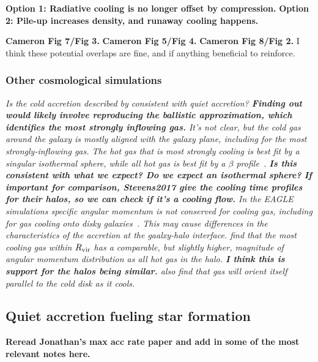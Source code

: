\documentclass[fleqn,usenatbib]{mnras}
\begin{document}
\textbf{Option 1: Radiative cooling is no longer offset by compression.}
\textbf{Option 2: Pile-up increases density, and runaway cooling happens.}

\textbf{Cameron Fig 7/Fig 3.}
\textbf{Cameron Fig 5/Fig 4.}
\textbf{Cameron Fig 8/Fig 2.}
I think these potential overlaps are fine, and if anything beneficial to reinforce.

\subsubsection{Other cosmological simulations}

\textit{
Is the cold accretion described by \cite{Ho2019} consistent with quiet accretion?
\textbf{Finding out would likely involve reproducing the ballistic approximation, which identifies the most strongly inflowing gas.}
It's not clear, but the cold gas around the galaxy is mostly aligned with the galaxy plane, including for the most strongly-inflowing gas.
The hot gas that is most strongly cooling is best fit by a singular isothermal sphere, while all hot gas is best fit by a $\beta$ profile~\citep{Stevens2017}.
\textbf{Is this consistent with what we expect? Do we expect an isothermal sphere?}
\textbf{If important for comparison, Stevens2017 give the cooling time profiles for their halos, so we can check if it's a cooling flow.}
In the EAGLE simulations specific angular momentum is not conserved for cooling gas, including for gas cooling onto disky galaxies~\citep{Stevens2017}.
This may cause differences in the characteristics of the accretion at the gaalxy-halo interface.
\cite{Stevens2017} find that the most cooling gas within $R_{\rm vir}$ has a comparable, but slightly higher, magnitude of angular momentum distribution as all hot gas in the halo.
\textbf{I think this is support for the halos being similar.}
\cite{Stevens2017} also find that gas will orient itself parallel to the cold disk as it cools.
}

\subsection{Quiet accretion fueling star formation}
\label{s: fueling}

\textbf{Reread Jonathan's max acc rate paper and add in some of the most relevant notes here.}
\end{document}
